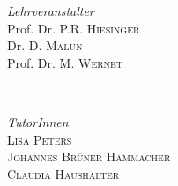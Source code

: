 \begin{titlepage}
\vfill

	\begin{minipage}{0.45\textwidth}
		\begin{flushleft}
			\large
			\textit{Lehrveranstalter}\\
			Prof. Dr. P.R. \textsc{Hiesinger}\\ 
			Dr. D. \textsc{Malun}\\ 
			Prof. Dr. M. \textsc{Wernet}
		\end{flushleft}
	\end{minipage}
	~
		\begin{minipage}{0.45\textwidth}
		\begin{flushright}
			
		\end{flushright}
	\end{minipage}
\vfill
	\begin{minipage}{0.45\textwidth}
		\begin{flushleft}
			\large
			\textit{TutorInnen}\\
			\textsc{Lisa Peters}\\
			\textsc{Johannes Brüner Hammacher}\\
			\textsc{Claudia Haushalter}
		\end{flushleft}
	\end{minipage}
	~
		\begin{minipage}{0.45\textwidth}
		\begin{flushright}
			
		\end{flushright}
	\end{minipage}

	
	
	\vfill\vfill\vfill %
	
	
	
	 
	
	\vfill %
	
\end{titlepage}

